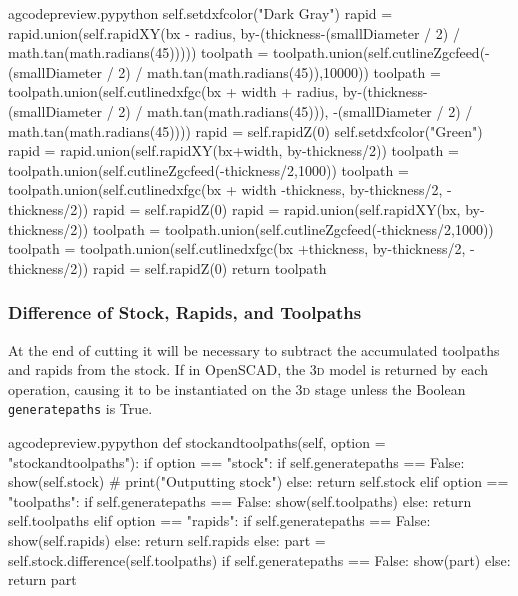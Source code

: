 \documentclass{ltxdoc}
\begin{document}
\begin{writecode}{a}{gcodepreview.py}{python}
                self.setdxfcolor("Dark Gray")
                rapid = rapid.union(self.rapidXY(bx - radius, by-(thickness-(smallDiameter / 2) / math.tan(math.radians(45)))))
                toolpath = toolpath.union(self.cutlineZgcfeed(-(smallDiameter / 2) / math.tan(math.radians(45)),10000))
                toolpath = toolpath.union(self.cutlinedxfgc(bx + width + radius, by-(thickness-(smallDiameter / 2) / math.tan(math.radians(45))), -(smallDiameter / 2) / math.tan(math.radians(45))))
                rapid = self.rapidZ(0)
                self.setdxfcolor("Green")
                rapid = rapid.union(self.rapidXY(bx+width, by-thickness/2))
                toolpath = toolpath.union(self.cutlineZgcfeed(-thickness/2,1000))
                toolpath = toolpath.union(self.cutlinedxfgc(bx + width -thickness, by-thickness/2, -thickness/2))
                rapid = self.rapidZ(0)
                rapid = rapid.union(self.rapidXY(bx, by-thickness/2))
                toolpath = toolpath.union(self.cutlineZgcfeed(-thickness/2,1000))
                toolpath = toolpath.union(self.cutlinedxfgc(bx +thickness, by-thickness/2, -thickness/2))
        rapid = self.rapidZ(0)
        return toolpath
    
\end{writecode}
\addtocounter{gcpy}{179}

\subsubsection{Difference of Stock, Rapids, and Toolpaths}

At the end of cutting it will be necessary to subtract the accumulated toolpaths and rapids from the stock. If in OpenSCAD, the \textsc{3d} model is returned by each operation, causing it to be instantiated on the \textsc{3d} stage unless the Boolean \verb|generatepaths| is True.

\lstset{firstnumber=\thegcpy}
\begin{writecode}{a}{gcodepreview.py}{python}
    def stockandtoolpaths(self, option = "stockandtoolpaths"):
        if option == "stock":
            if self.generatepaths == False:
                show(self.stock)
#                print("Outputting stock")
            else:
                return self.stock
        elif option == "toolpaths":
            if self.generatepaths == False:
                show(self.toolpaths)
            else:
                return self.toolpaths
        elif option == "rapids":
            if self.generatepaths == False:
                show(self.rapids)
            else:
                return self.rapids
        else:
            part = self.stock.difference(self.toolpaths)
            if self.generatepaths == False:
                show(part)
            else:
                return part
                    
\end{writecode}
\addtocounter{gcpy}{24}
\end{document}
